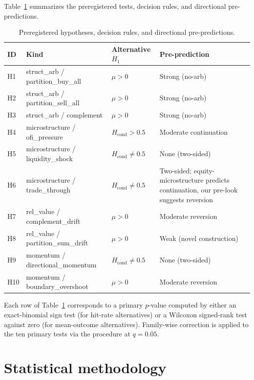 \documentclass[review,12pt,authoryear]{elsarticle}
\begin{document}
Table~\ref{tab:hypotheses} summarizes the preregistered tests, decision
rules, and directional pre-predictions.

\begin{table}[t]
\centering
\caption{Preregistered hypotheses, decision rules, and directional pre-predictions.}
\label{tab:hypotheses}
\small
\begin{tabularx}{\linewidth}{l l X l}
\toprule
ID & Kind & Alternative \(H_1\) & Pre-prediction \\
\midrule
H1 & struct\_arb / partition\_buy\_all   & \(\mu > 0\)              & Strong (no-arb) \\
H2 & struct\_arb / partition\_sell\_all  & \(\mu > 0\)              & Strong (no-arb) \\
H3 & struct\_arb / complement            & \(\mu > 0\)              & Strong (no-arb) \\
H4 & microstructure / ofi\_pressure       & \(H_\text{cond} > 0.5\)  & Moderate continuation \\
H5 & microstructure / liquidity\_shock    & \(H_\text{cond} \neq 0.5\) & None (two-sided) \\
H6 & microstructure / trade\_through      & \(H_\text{cond} \neq 0.5\) & Two-sided; equity-microstructure predicts continuation, our pre-look suggests reversion \\
H7 & rel\_value / complement\_drift       & \(\mu > 0\)              & Moderate reversion \\
H8 & rel\_value / partition\_sum\_drift   & \(\mu > 0\)              & Weak (novel construction) \\
H9 & momentum / directional\_momentum     & \(H_\text{cond} \neq 0.5\) & None (two-sided) \\
H10 & momentum / boundary\_overshoot      & \(\mu > 0\)              & Moderate reversion \\
\bottomrule
\end{tabularx}
\end{table}

Each row of Table~\ref{tab:hypotheses} corresponds to a primary
\(p\)-value computed by either an exact-binomial sign test (for hit-rate
alternatives) or a Wilcoxon signed-rank test against zero (for mean-outcome
alternatives). Family-wise correction is applied to the ten primary tests
via the \citet{BenjaminiHochberg1995} procedure at \(q = 0.05\).

\section{Statistical methodology}
\label{sec:methods}
\end{document}
